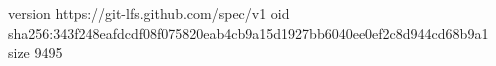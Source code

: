 version https://git-lfs.github.com/spec/v1
oid sha256:343f248eafdcdf08f075820eab4cb9a15d1927bb6040ee0ef2c8d944cd68b9a1
size 9495
